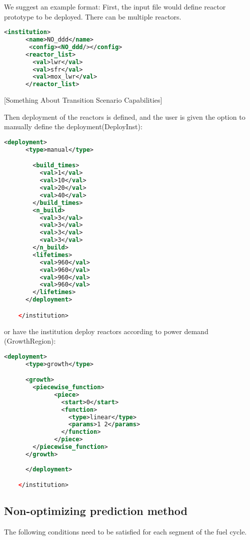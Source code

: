 \documentclass[12pt,letterpaper]{article}
\begin{document}
We suggest an example format:
First, the input file would define reactor prototype to be deployed. There can be multiple reactors.
\begin{lstlisting}[language=XML, caption=One-reactor fleet institution input schema]
<institution>
      <name>NO_ddd</name>
       <config><NO_ddd/></config>
      <reactor_list>
        <val>lwr</val>
        <val>sfr</val>
        <val>mox_lwr</val>
      </reactor_list>
\end{lstlisting}

[Something About Transition Scenario Capabilities]

Then deployment of the reactors is defined, and the user
is given the option to manually define the deployment(DeployInst):
\begin{lstlisting}[language=XML, caption=Reactor deployment input schema]
      <deployment>
      <type>manual</type>

        <build_times>
          <val>1</val>
          <val>10</val>
          <val>20</val>
          <val>40</val>
        </build_times>
        <n_build>
          <val>3</val>
          <val>3</val>
          <val>3</val>
          <val>3</val>
        </n_build>
        <lifetimes>
          <val>960</val>
          <val>960</val>
          <val>960</val>
          <val>960</val>
        </lifetimes>
      </deployment>

    </institution>
\end{lstlisting}

or have the institution
deploy reactors according to power demand (GrowthRegion):

\begin{lstlisting}[language=XML, caption=Reactor deployment input schema]
      <deployment>
      <type>growth</type>

      <growth>
        <piecewise_function>
              <piece>
                <start>0</start>
                <function>
                  <type>linear</type>
                  <params>1 2</params>
                </function>
              </piece>
        </piecewise_function>
      </growth>
      
      </deployment>

    </institution>
\end{lstlisting}

\subsection{Non-optimizing prediction method}
The following conditions need to be satisfied for each segment of the fuel cycle. 
\end{document}
